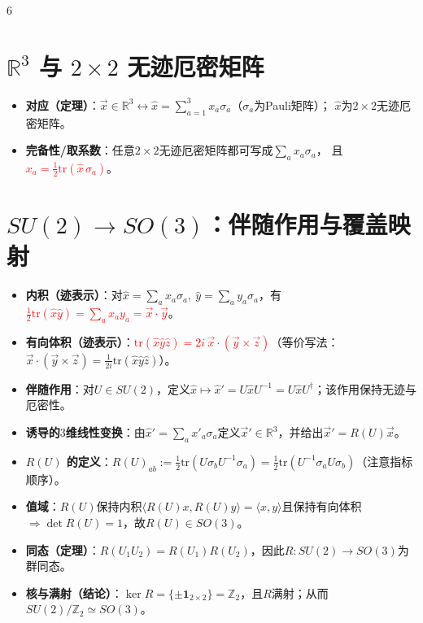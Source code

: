 \documentclass[landscape]{article}
\begin{document}
\begin{multicols*}{6}
\section*{$\mathbb{R}^3$ 与 $2\times2$ 无迹厄密矩阵}
\begin{itemize}
  \item \textbf{对应（定理）}：$\vec x\in\mathbb{R}^3 \leftrightarrow \hat x=\sum_{a=1}^3 x_a\sigma_a$（$\sigma_a$为Pauli矩阵）；
  $\hat x$为$2\times2$无迹厄密矩阵。
  \item \textbf{完备性/取系数}：任意$2\times2$无迹厄密矩阵都可写成$\sum_a x_a\sigma_a$，
  且\textcolor{red}{$x_a=\tfrac12\mathrm{tr}(\hat x\,\sigma_a)$}。
\end{itemize}

\section*{$SU(2)\to SO(3)$：伴随作用与覆盖映射}
\begin{itemize}
  \item \textbf{内积（迹表示）}：对$\hat x=\sum_a x_a\sigma_a,\ \hat y=\sum_a y_a\sigma_a$，有\textcolor{red}{$\tfrac12\mathrm{tr}(\hat x\hat y)=\sum_a x_ay_a=\vec x\cdot\vec y$}。
  \item \textbf{有向体积（迹表示）}：\textcolor{red}{$\mathrm{tr}(\hat x\hat y\hat z)=2i\,\vec x\cdot(\vec y\times\vec z)$}（等价写法：$\vec x\cdot(\vec y\times\vec z)=\tfrac{1}{2i}\mathrm{tr}(\hat x\hat y\hat z)$）。
  \item \textbf{伴随作用}：对$U\in SU(2)$，定义$\hat x\mapsto \hat x'=U\hat xU^{-1}=U\hat xU^{\dagger}$；该作用保持无迹与厄密性。
  \item \textbf{诱导的$3$维线性变换}：由$\hat x'=\sum_a x'_a\sigma_a$定义$\vec x'\in\mathbb{R}^3$，并给出$\vec x'=R(U)\vec x$。
  \item \textbf{$R(U)$ 的定义}：$R(U)_{ab}:=\tfrac12\mathrm{tr}(U\sigma_bU^{-1}\sigma_a)=\tfrac12\mathrm{tr}(U^{-1}\sigma_aU\sigma_b)$（注意指标顺序）。
  \item \textbf{值域}：$R(U)$保持内积$\langle R(U)x,R(U)y\rangle=\langle x,y\rangle$且保持有向体积$\Rightarrow \det R(U)=1$，故$R(U)\in SO(3)$。
  \item \textbf{同态（定理）}：$R(U_1U_2)=R(U_1)R(U_2)$，因此$R:SU(2)\to SO(3)$为群同态。
  \item \textbf{核与满射（结论）}：$\ker R=\{\pm\mathbf{1}_{2\times2}\}=\mathbb{Z}_2$，且$R$满射；从而$SU(2)/\mathbb{Z}_2\simeq SO(3)$。
\end{itemize}


\end{multicols*}
\end{document}
